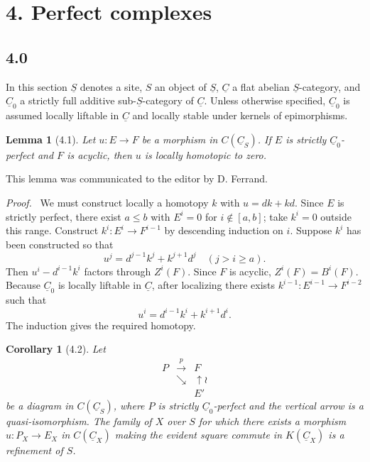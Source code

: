 \documentclass[13pt]{extarticle}
\newcommand{\uS}{\underline S}
\newcommand{\uC}{\underline C}
\newenvironment{prooftext}[1][Proof]{\par\noindent\emph{#1.}\ }{\par\medskip}
\newtheorem*{lemma*}{Lemma}
\newtheorem*{corollary*}{Corollary}
\begin{document}
\section*{4. Perfect complexes}

\subsection*{4.0}
In this section $\uS$ denotes a site, $S$ an object of $\uS$, $\uC$ a flat abelian $\uS$-category, and $\uC_0$ a strictly full additive sub-$\uS$-category of $\uC$. Unless otherwise specified, $\uC_0$ is assumed locally liftable in $\uC$ and locally stable under kernels of epimorphisms.

\begin{lemma*}[4.1]
Let $u:E\to F$ be a morphism in $C(\uC_S)$. If $E$ is strictly $\uC_0$-perfect and $F$ is acyclic, then $u$ is locally homotopic to zero.
\end{lemma*}

This lemma was communicated to the editor by D. Ferrand.

\begin{prooftext}
We must construct locally a homotopy $k$ with $u=dk+kd$. Since $E$ is strictly perfect, there exist $a\leq b$ with $E^i=0$ for $i\notin[a,b]$; take $k^i=0$ outside this range. Construct $k^i:E^i\to F^{i-1}$ by descending induction on $i$. Suppose $k^i$ has been constructed so that
\[
u^j=d^{j-1}k^j+k^{j+1}d^j\quad(j>i\geq a).
\]
Then $u^i-d^{i-1}k^i$ factors through $Z^i(F)$. Since $F$ is acyclic, $Z^i(F)=B^i(F)$. Because $\uC_0$ is locally liftable in $\uC$, after localizing there exists $k^{i-1}:E^{i-1}\to F^{i-2}$ such that
\[
u^i=d^{i-1}k^i+k^{i+1}d^i.
\]
The induction gives the required homotopy.
\end{prooftext}

\begin{corollary*}[4.2]
Let
\[
\begin{array}{ccc}
P&\xrightarrow{p}&F\\
&\searrow&\uparrow\wr\\
&&E'
\end{array}
\]
be a diagram in $C(\uC_S)$, where $P$ is strictly $\uC_0$-perfect and the vertical arrow is a quasi-isomorphism. The family of $X$ over $S$ for which there exists a morphism $u:P_X\to E_X$ in $C(\uC_X)$ making the evident square commute in $K(\uC_X)$ is a refinement of $S$.
\end{corollary*}
\end{document}

